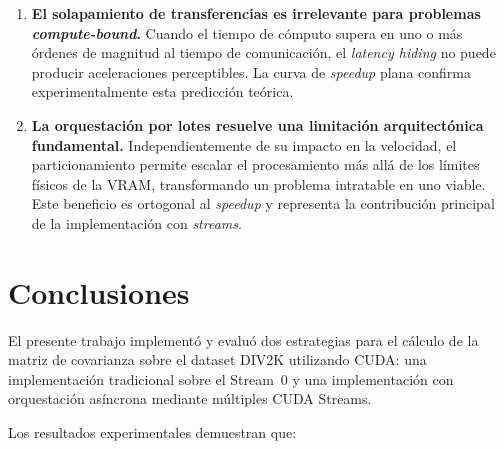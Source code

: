 \documentclass[12pt, a4paper]{article}
\begin{document}
\begin{enumerate}
    \item \textbf{El solapamiento de transferencias es irrelevante para
    problemas \textit{compute-bound}.} Cuando el tiempo de cómputo supera en
    uno o más órdenes de magnitud al tiempo de comunicación, el \textit{latency
    hiding} no puede producir aceleraciones perceptibles. La curva de
    \textit{speedup} plana confirma experimentalmente esta predicción teórica.

    \item \textbf{La orquestación por lotes resuelve una limitación
    arquitectónica fundamental.} Independientemente de su impacto en la
    velocidad, el particionamiento permite escalar el procesamiento más allá
    de los límites físicos de la VRAM, transformando un problema intratable
    en uno viable. Este beneficio es ortogonal al \textit{speedup} y
    representa la contribución principal de la implementación con
    \textit{streams}.
\end{enumerate}

\section{Conclusiones}

El presente trabajo implementó y evaluó dos estrategias para el cálculo de la
matriz de covarianza sobre el dataset DIV2K utilizando CUDA: una
implementación tradicional sobre el Stream~0 y una implementación con
orquestación asíncrona mediante múltiples CUDA Streams.

Los resultados experimentales demuestran que:
\end{document}

